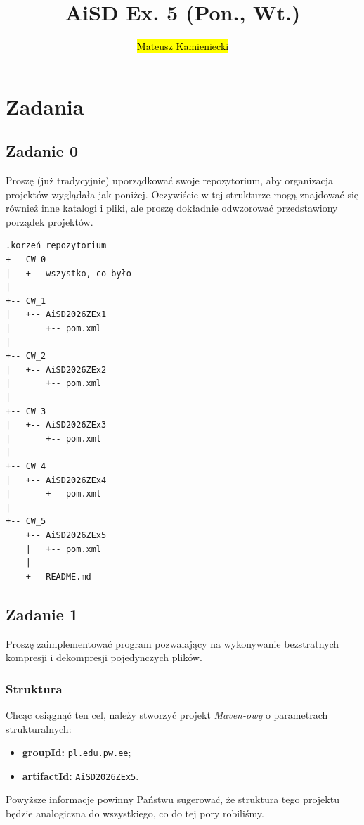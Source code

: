 \documentclass[twoside]{article}
\title{AiSD Ex. 5 (Pon., Wt.)}
\author{\hl{Mateusz Kamieniecki}}
\date{}
\begin{document}
\pagestyle{fancy}
\fancyhead{}
\fancyhead[L]{\@title}
\fancyhead[R]{\@author}
\fancyhead[C]{\@date}

\cfoot{\thepage\ / \pageref{LastPage}}


\newpage
\section{Zadania}


\subsection{Zadanie 0}
Proszę (już tradycyjnie) uporządkować swoje repozytorium, aby organizacja projektów wyglądała jak poniżej. 
Oczywiście w tej strukturze mogą znajdować się również inne katalogi i pliki, ale proszę
dokładnie odwzorować przedstawiony porządek projektów.

\label{struktura}
\begin{verbatim}
.korzeń_repozytorium
+-- CW_0
|   +-- wszystko, co było
|
+-- CW_1
|   +-- AiSD2026ZEx1
|       +-- pom.xml
|
+-- CW_2
|   +-- AiSD2026ZEx2
|       +-- pom.xml
|
+-- CW_3
|   +-- AiSD2026ZEx3
|       +-- pom.xml
|
+-- CW_4
|   +-- AiSD2026ZEx4
|       +-- pom.xml
|
+-- CW_5
    +-- AiSD2026ZEx5
    |   +-- pom.xml
    |
    +-- README.md
\end{verbatim}

\newpage

\subsection{Zadanie 1}
Proszę zaimplementować program pozwalający na wykonywanie bezstratnych kompresji i dekompresji pojedynczych plików.

\subsubsection{Struktura}

Chcąc osiągnąć ten cel, należy stworzyć projekt \textit{Maven-owy} o parametrach strukturalnych:
\begin{itemize}
    \item \textbf{groupId:} \verb|pl.edu.pw.ee|;
    \item \textbf{artifactId:} \verb|AiSD2026ZEx5|.
\end{itemize}

Powyższe informacje powinny Państwu sugerować, że struktura tego projektu będzie analogiczna 
do wszystkiego, co do tej pory robiliśmy.
\end{document}
